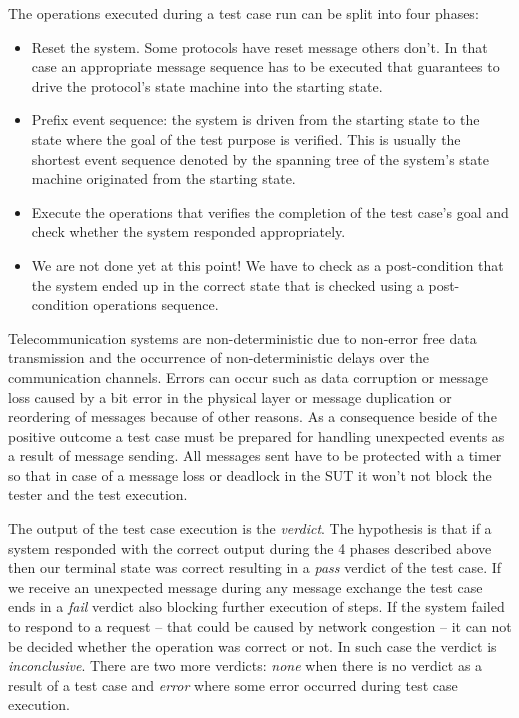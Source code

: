 \documentclass[a4paper]{article}
\begin{document}
The operations executed during a test case run can be split into four phases:
\begin{itemize}
    \item Reset the system. Some protocols have reset message others don't. In that case an appropriate message
          sequence
          has to be executed that guarantees to drive the protocol's state machine into the starting state.
    \item Prefix event sequence: the system is driven from the starting state to the state where the goal of the test
          purpose is verified. This is usually the shortest event sequence denoted by the spanning tree of the system's
          state
          machine originated from the starting state.
    \item Execute the operations that verifies the completion of the test case's goal and check whether the system
          responded appropriately.
    \item We are not done yet at this point! We have to check as a post-condition that the system ended up in the
          correct
          state that is checked using a post-condition operations sequence.
\end{itemize}

Telecommunication systems are non-deterministic due to non-error free data transmission and the occurrence of
non-deterministic delays over the communication channels. Errors can occur such as data corruption or message loss
caused by a bit error in the physical layer or message duplication or reordering of messages because of other reasons.
As a consequence beside of the positive outcome a test case must be prepared for handling unexpected events as a result
of message sending. All messages sent have to be protected with a timer so that in case of a message loss or deadlock
in the SUT it won't not block the tester and the test execution.

The output of the test case execution is the \emph{verdict}. The hypothesis is that if a system responded with the
correct output during the 4 phases described above then our terminal state was correct resulting in a \emph{pass}
verdict of the test case. If we receive an unexpected message during any message exchange the test case ends in a
\emph{fail} verdict also blocking further execution of steps. If the system failed to respond to a request -- that
could be caused by network congestion -- it can not be decided whether the operation was correct or not. In such case
the verdict is \emph{inconclusive}. There are two more verdicts: \emph{none} when there is no verdict as a result of a
test case and \emph{error} where some error occurred during test case execution.
\end{document}
